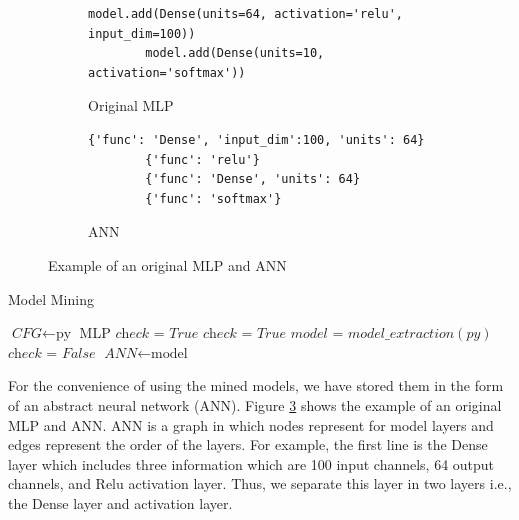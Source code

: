 \begin{figure}
	\vspace{-15pt}
	\centering
	\begin{subfigure}[b]{.45\linewidth}
		\begin{lstlisting}[basicstyle=\footnotesize,numberblanklines=false]
		model.add(Dense(units=64, activation='relu', input_dim=100)) 
		model.add(Dense(units=10, activation='softmax'))\end{lstlisting}
		\caption{Original MLP}
		\label{fig:originalCNN}
	\end{subfigure}
	\begin{subfigure}[b]{.52\linewidth}
		\begin{lstlisting}[basicstyle=\footnotesize,numberblanklines=false]	
		{'func': 'Dense', 'input_dim':100, 'units': 64} 
		{'func': 'relu'}
		{'func': 'Dense', 'units': 64}
		{'func': 'softmax'}\end{lstlisting}
		\caption{ANN}
		\label{fig:convertedCNN}
	\end{subfigure}
	\caption{Example of an original MLP and ANN}
	\label{fig:converted}
\end{figure}
\begin{algorithm}
	\caption{Model Mining}\label{euclid}
	\begin{algorithmic}[1]
		\State $\textit{CFG} \gets \text{py}$
		\State \Return MLP
		\EndProcedure
		\State $\textit{check = True} $
		\State $\textit{check = True} $
		\State $model$ = $model\_extraction(py)$ 
		\State $\textit{check = False} $
		\EndIf
		\EndFor
		\State $\textit{ANN}  \gets \text{model}$
		\EndIf
		\EndFor
		
		\EndProcedure	
	\end{algorithmic}
\end{algorithm}



For the convenience of using the mined models, we have stored them in the form of an abstract neural network (ANN). Figure \ref{fig:converted} shows the example of an original MLP and ANN. ANN is a graph in which nodes represent for model layers and edges represent the order of the layers. For example, the first line is the Dense layer which includes three information which are 100 input channels, 64 output channels, and Relu activation layer. Thus, we separate this layer in two layers i.e., the Dense layer and activation layer.


